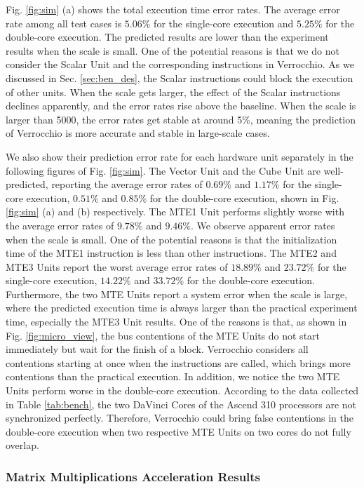 \documentclass[12pt]{extbook}
\begin{document}
Fig. \ref{fig:sim} (a) shows the total execution time error rates. The average error rate among all test cases is $5.06\%$ for the single-core execution and $5.25\%$ for the double-core execution. The predicted results are lower than the experiment results when the scale is small. One of the potential reasons is that we do not consider the Scalar Unit and the corresponding instructions in Verrocchio. As we discussed in Sec. \ref{sec:ben_des}, the Scalar instructions could block the execution of other units. When the scale gets larger, the effect of the Scalar instructions declines apparently, and the error rates rise above the baseline. When the scale is larger than 5000, the error rates get stable at around 5\%, meaning the prediction of Verrocchio is more accurate and stable in large-scale cases. 

We also show their prediction error rate for each hardware unit separately in the following figures of Fig. \ref{fig:sim}. The Vector Unit and the Cube Unit are well-predicted, reporting the average error rates of $0.69\%$ and $1.17\%$ for the single-core execution, $0.51\%$ and $0.85\%$ for the double-core execution, shown in Fig. \ref{fig:sim} (a) and (b) respectively. The MTE1 Unit performs slightly worse with the average error rates of $9.78\%$ and $9.46\%$. We observe apparent error rates when the scale is small. One of the potential reasons is that the initialization time of the MTE1 instruction is less than other instructions. The MTE2 and MTE3 Units report the worst average error rates of $18.89\%$ and $23.72\%$ for the single-core execution, $14.22\%$ and $33.72\%$ for the double-core execution. Furthermore, the two MTE Units report a system error when the scale is large, where the predicted execution time is always larger than the practical experiment time, especially the MTE3 Unit results. One of the reasons is that, as shown in Fig. \ref{fig:micro_view}, the bus contentions of the MTE Units do not start immediately but wait for the finish of a block. Verrocchio considers all contentions starting at once when the instructions are called, which brings more contentions than the practical execution. In addition, we notice the two MTE Units perform worse in the double-core execution. According to the data collected in Table \ref{tab:bench}, the two DaVinci Cores of the Ascend 310 processors are not synchronized perfectly. Therefore, Verrocchio could bring false contentions in the double-core execution when two respective MTE Units on two cores do not fully overlap.

\subsubsection{Matrix Multiplications Acceleration Results}
\end{document}
